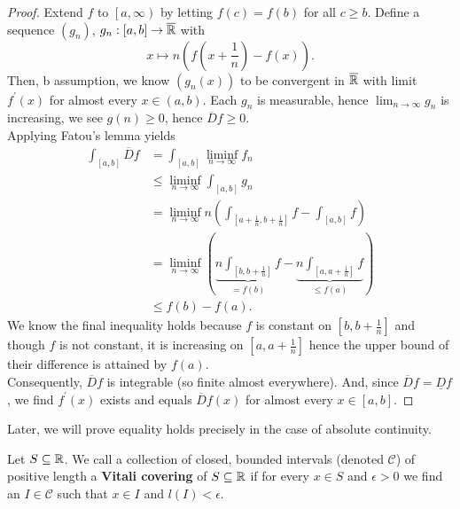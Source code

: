 \begin{proof}
	Extend \(f\) to \(\left[ a, \infty \right) \) by letting \(f\left( c \right) = f\left( b \right) \) for all \(c \ge b\). Define a sequence \(\left( g_{n} \right) \), \(g_{n}: \left[ a, b \right] \to \overline{\mathbb{R}}\) with \[
		x \mapsto n\left( f\left( x + \frac{1}{n} \right) - f\left( x \right)  \right)
	.\]
	Then, b assumption, we know \(\left( g_{n}\left( x \right)  \right) \) to be convergent in \(\overline{\mathbb{R}}\) with limit \(f^{\prime}\left( x \right) \)  for almost every \(x \in \left( a, b \right) \). Each \(g_{n}\) is measurable, hence \(\lim_{n \to \infty}g_{n}\) is increasing, we see \(g\left( n \right) \ge 0\), hence \(\overline{D}f \ge 0\).\\
	Applying Fatou's lemma yields
	\begin{align*}
		\int_{\left[ a, b \right] }\overline{D}f &=  \int_{\left[ a, b \right] }\liminf_{n \to \infty} f_{n} \\
							 &\le \liminf_{n \to \infty} \int_{\left[ a, b \right] }g_{n} \\
							 &= \liminf_{n \to \infty} n \left( \int_{\left[ a + \frac{1}{n}, b + \frac{1}{n} \right] }f - \int_{\left[ a, b \right] }f \right)  \\
							 &= \liminf_{n \to \infty} \left( \underbrace{n\int_{\left[b, b+\frac{1}{n}\right]}f}_{= f\left( b \right) }  - \underbrace{n\int _{\left[ a, a + \frac{1}{n} \right] } f}_{\le f\left( a \right) } \right)   \\
							 &\le f\left( b \right) - f\left( a \right)
	.\end{align*}
	We know the final inequality holds because \(f\) is constant on \(\left[ b, b + \frac{1}{n} \right] \) and though \(f\) is not constant, it is increasing on \(\left[ a, a + \frac{1}{n} \right] \) hence the upper bound of their difference is attained by \(f\left( a \right) \).\\
	Consequently, \(\overline{D} f\) is integrable (so finite almost everywhere). And, since \(\overline{D}f = \underline{D}f\) , we find \(f^{\prime}\left( x \right) \) exists and equals \(\overline{D}f\left( x \right) \) for almost every \(x \in \left[ a, b \right] \).
\end{proof}
Later, we will prove equality holds precisely in the case of absolute continuity.
\begin{definition}
	Let \(S \subseteq \mathbb{R}\). We call a collection of closed, bounded intervals (denoted \(\mathscr{C}\)) of positive length a \textbf{Vitali covering} of \(S \subseteq \mathbb{R}\) if for every \(x \in S\) and \(\epsilon > 0\) we find an \(I \in \mathscr{C}\) such that \(x \in I\) and \(l\left( I \right) < \epsilon \).
\end{definition}
